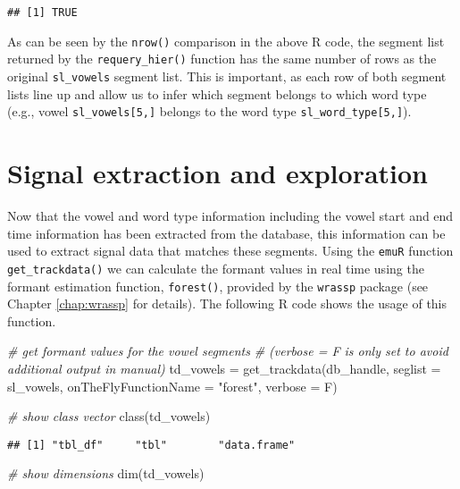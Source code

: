 \documentclass[
]{book}
\newenvironment{Shaded}{\begin{snugshade}}{\end{snugshade}}
\newcommand{\AttributeTok}[1]{\textcolor[rgb]{0.77,0.63,0.00}{#1}}
\newcommand{\CommentTok}[1]{\textcolor[rgb]{0.56,0.35,0.01}{\textit{#1}}}
\newcommand{\FunctionTok}[1]{\textcolor[rgb]{0.00,0.00,0.00}{#1}}
\newcommand{\NormalTok}[1]{#1}
\newcommand{\OtherTok}[1]{\textcolor[rgb]{0.56,0.35,0.01}{#1}}
\newcommand{\StringTok}[1]{\textcolor[rgb]{0.31,0.60,0.02}{#1}}
\begin{document}
\begin{verbatim}
## [1] TRUE
\end{verbatim}

As can be seen by the \texttt{nrow()} comparison in the above R code, the segment list returned by the \texttt{requery\_hier()} function has the same number of rows as the original \texttt{sl\_vowels} segment list. This is important, as each row of both segment lists line up and allow us to infer which segment belongs to which word type (e.g., vowel \texttt{sl\_vowels{[}5,{]}} belongs to the word type \texttt{sl\_word\_type{[}5,{]}}).

\hypertarget{section:tutorial-sigExtrAndExpl}{%
\section{Signal extraction and exploration}\label{section:tutorial-sigExtrAndExpl}}

Now that the vowel and word type information including the vowel start and end time information has been extracted from the database, this information can be used to extract signal data that matches these segments. Using the \texttt{emuR} function \texttt{get\_trackdata()} we can calculate the formant values in real time using the formant estimation function, \texttt{forest()}, provided by the \texttt{wrassp} package (see Chapter \ref{chap:wrassp} for details). The following R code shows the usage of this function.

\begin{Shaded}
\begin{Highlighting}[]
\CommentTok{\# get formant values for the vowel segments}
\CommentTok{\# (verbose = F is only set to avoid additional output in manual)}
\NormalTok{td\_vowels }\OtherTok{=} \FunctionTok{get\_trackdata}\NormalTok{(db\_handle,}
                          \AttributeTok{seglist =}\NormalTok{ sl\_vowels,}
                          \AttributeTok{onTheFlyFunctionName =} \StringTok{"forest"}\NormalTok{,}
                          \AttributeTok{verbose =}\NormalTok{ F)}

\CommentTok{\# show class vector}
\FunctionTok{class}\NormalTok{(td\_vowels)}
\end{Highlighting}
\end{Shaded}

\begin{verbatim}
## [1] "tbl_df"     "tbl"        "data.frame"
\end{verbatim}

\begin{Shaded}
\begin{Highlighting}[]
\CommentTok{\# show dimensions}
\FunctionTok{dim}\NormalTok{(td\_vowels)}
\end{Highlighting}
\end{Shaded}
\end{document}
